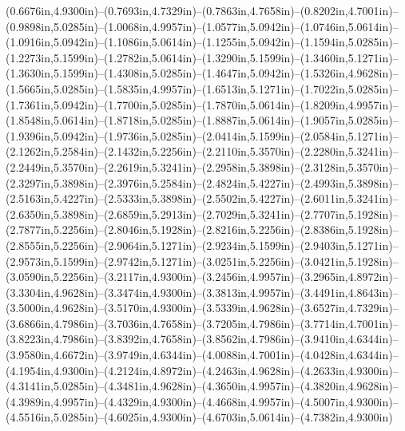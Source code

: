 (0.6676in,4.9300in)--(0.7693in,4.7329in)--(0.7863in,4.7658in)--(0.8202in,4.7001in)--(0.9898in,5.0285in)--(1.0068in,4.9957in)--(1.0577in,5.0942in)--(1.0746in,5.0614in)--(1.0916in,5.0942in)--(1.1086in,5.0614in)--(1.1255in,5.0942in)--(1.1594in,5.0285in)--(1.2273in,5.1599in)--(1.2782in,5.0614in)--(1.3290in,5.1599in)--(1.3460in,5.1271in)--(1.3630in,5.1599in)--(1.4308in,5.0285in)--(1.4647in,5.0942in)--(1.5326in,4.9628in)--(1.5665in,5.0285in)--(1.5835in,4.9957in)--(1.6513in,5.1271in)--(1.7022in,5.0285in)--(1.7361in,5.0942in)--(1.7700in,5.0285in)--(1.7870in,5.0614in)--(1.8209in,4.9957in)--(1.8548in,5.0614in)--(1.8718in,5.0285in)--(1.8887in,5.0614in)--(1.9057in,5.0285in)--(1.9396in,5.0942in)--(1.9736in,5.0285in)--(2.0414in,5.1599in)--(2.0584in,5.1271in)--(2.1262in,5.2584in)--(2.1432in,5.2256in)--(2.2110in,5.3570in)--(2.2280in,5.3241in)--(2.2449in,5.3570in)--(2.2619in,5.3241in)--(2.2958in,5.3898in)--(2.3128in,5.3570in)--(2.3297in,5.3898in)--(2.3976in,5.2584in)--(2.4824in,5.4227in)--(2.4993in,5.3898in)--(2.5163in,5.4227in)--(2.5333in,5.3898in)--(2.5502in,5.4227in)--(2.6011in,5.3241in)--(2.6350in,5.3898in)--(2.6859in,5.2913in)--(2.7029in,5.3241in)--(2.7707in,5.1928in)--(2.7877in,5.2256in)--(2.8046in,5.1928in)--(2.8216in,5.2256in)--(2.8386in,5.1928in)--(2.8555in,5.2256in)--(2.9064in,5.1271in)--(2.9234in,5.1599in)--(2.9403in,5.1271in)--(2.9573in,5.1599in)--(2.9742in,5.1271in)--(3.0251in,5.2256in)--(3.0421in,5.1928in)--(3.0590in,5.2256in)--(3.2117in,4.9300in)--(3.2456in,4.9957in)--(3.2965in,4.8972in)--(3.3304in,4.9628in)--(3.3474in,4.9300in)--(3.3813in,4.9957in)--(3.4491in,4.8643in)--(3.5000in,4.9628in)--(3.5170in,4.9300in)--(3.5339in,4.9628in)--(3.6527in,4.7329in)--(3.6866in,4.7986in)--(3.7036in,4.7658in)--(3.7205in,4.7986in)--(3.7714in,4.7001in)--(3.8223in,4.7986in)--(3.8392in,4.7658in)--(3.8562in,4.7986in)--(3.9410in,4.6344in)--(3.9580in,4.6672in)--(3.9749in,4.6344in)--(4.0088in,4.7001in)--(4.0428in,4.6344in)--(4.1954in,4.9300in)--(4.2124in,4.8972in)--(4.2463in,4.9628in)--(4.2633in,4.9300in)--(4.3141in,5.0285in)--(4.3481in,4.9628in)--(4.3650in,4.9957in)--(4.3820in,4.9628in)--(4.3989in,4.9957in)--(4.4329in,4.9300in)--(4.4668in,4.9957in)--(4.5007in,4.9300in)--(4.5516in,5.0285in)--(4.6025in,4.9300in)--(4.6703in,5.0614in)--(4.7382in,4.9300in) 
